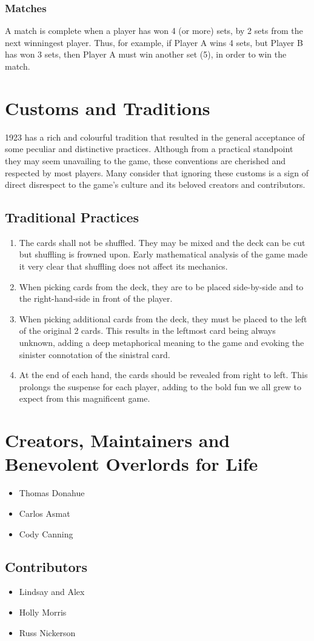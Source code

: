 \documentclass[11pt]{article}
\begin{document}
\subsubsection{Matches}
\label{sec-2-2-4}


A match is complete when a player has won 4 (or more) sets, by 2 sets
from the next winningest player. Thus, for example, if Player A wins 4
sets, but Player B has won 3 sets, then Player A must win another set
(5), in order to win the match.
\section{Customs and Traditions}
\label{sec-3}


1923 has a rich and colourful tradition that resulted in the general acceptance
of some peculiar and distinctive practices. Although from a practical standpoint
they may seem unavailing to the game, these conventions are cherished and
respected by most players. Many consider that ignoring these customs is a sign
of direct disrespect to the game's culture and its beloved creators and
contributors.
\subsection{Traditional Practices}
\label{sec-3-1}

\begin{enumerate}
\item The cards shall not be shuffled. They may be mixed and the deck can be cut
   but shuffling is frowned upon. Early mathematical analysis of the game made
   it very clear that shuffling does not affect its mechanics.
\item When picking cards from the deck, they are to be placed side-by-side and to
   the right-hand-side in front of the player.
\item When picking additional cards from the deck, they must be placed to the left
   of the original 2 cards. This results in the leftmost card being always
   unknown, adding a deep metaphorical meaning to the game and evoking the
   sinister connotation of the sinistral card.
\item At the end of each hand, the cards should be revealed from right to left.
   This prolongs the suspense for each player, adding to the bold fun we all
   grew to expect from this magnificent game.
\end{enumerate}
\section{Creators, Maintainers and Benevolent Overlords for Life}
\label{sec-4}

\begin{itemize}
\item Thomas Donahue
\item Carlos Asmat
\item Cody Canning
\end{itemize}
\subsection{Contributors}
\label{sec-4-1}

\begin{itemize}
\item Lindsay and Alex
\item Holly Morris
\item Russ Nickerson
\end{itemize}
  
\end{document}
